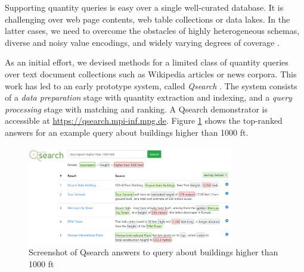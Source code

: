 \documentclass[11pt]{article}
\begin{document}
Supporting quantity queries is easy over a 
single well-curated database. It is challenging over
web page contents, 
web table 
collections or data lakes.
In the latter cases, we need to overcome the
obstacles of
highly heterogeneous schemas,
diverse and noisy value encodings, and widely varying degrees of
coverage \cite{Miller:DEbull2018}.

As an initial effort,
we devised methods for
a limited class of quantity queries over text document collections such as
Wikipedia articles or news corpora. This work has led to an early
prototype system, called {\em Qsearch} \cite{Ho:ISWC2019,Ho:WSDM2020}.
The system consists of a {\em data preparation} stage with quantity extraction
and indexing, and a {\em query processing} stage with matching and ranking.
A Qsearch demonstrator is accessible at
{\small\url{https://qsearch.mpi-inf.mpg.de}}. 
Figure \ref{fig1-qsearch-screenshot} shows the top-ranked answers
for an example query about buildings higher than 1000 ft.

\begin{figure} [tb]
  \centering
   \includegraphics[width=0.8\textwidth]{letters/fig1-qsearch-screenshot.png}
\vspace*{-0.3cm} 
     \caption{Screenshot of Qsearch answers to query about buildings higher than 1000 ft}
      \label{fig1-qsearch-screenshot}
\end{figure}
\end{document}
